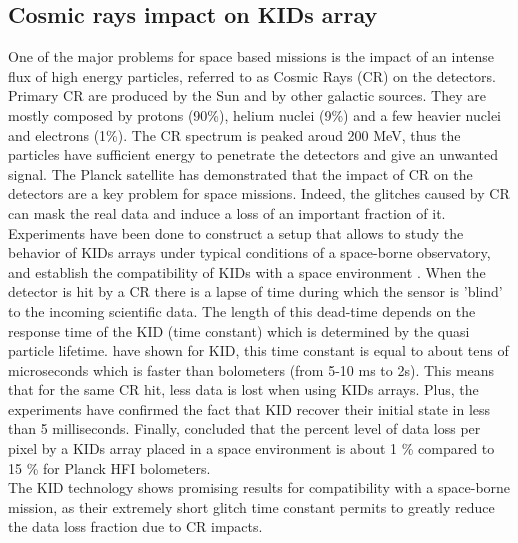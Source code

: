 
\subsection{Cosmic rays impact on KIDs array}

One of the major problems for space based missions is the impact of an intense flux of high energy particles, referred to as Cosmic Rays (CR) on the detectors. Primary CR are produced by the Sun and by other galactic sources. They are mostly composed by protons (90\%), helium nuclei (9\%) and a few heavier nuclei and electrons (1\%). The CR spectrum is peaked aroud 200 MeV, thus the particles have sufficient energy to penetrate the detectors and give an unwanted signal. The Planck satellite \citep{2014A&A...571A..10P} has demonstrated that the impact of CR on the detectors are a key problem for space missions. Indeed, the glitches caused by CR can mask the real data and induce a loss of an important fraction of it.\\
Experiments have been done to construct a setup that allows to study the behavior of KIDs arrays under typical conditions of a space-borne observatory, and establish the compatibility of KIDs with a space environment \citep{2016A&A...592A..26C,2016SPIE.9914E..0NM}. When the detector is hit by a CR there is a lapse of time during which the sensor is 'blind' to the incoming scientific data. The length of this dead-time depends on the response time of the KID (time constant) which is determined by the quasi particle lifetime. \citet{2012ApPhL.100w2601M} have shown for KID, this time constant is equal to about tens of microseconds which is faster than bolometers (from 5-10 ms to 2s). This means that for the same CR hit, less data is lost when using KIDs arrays. Plus, the experiments have confirmed the fact that KID recover their initial state in less than 5 milliseconds. Finally, \citet{2016SPIE.9914E..0NM} concluded that the percent level of data loss per pixel by a KIDs array placed in a space environment is about 1 \% compared to 15 \% for Planck HFI bolometers.\\ The KID technology shows promising results for compatibility with a space-borne mission, as their extremely short glitch time constant permits to greatly reduce the data loss fraction due to CR impacts. 

